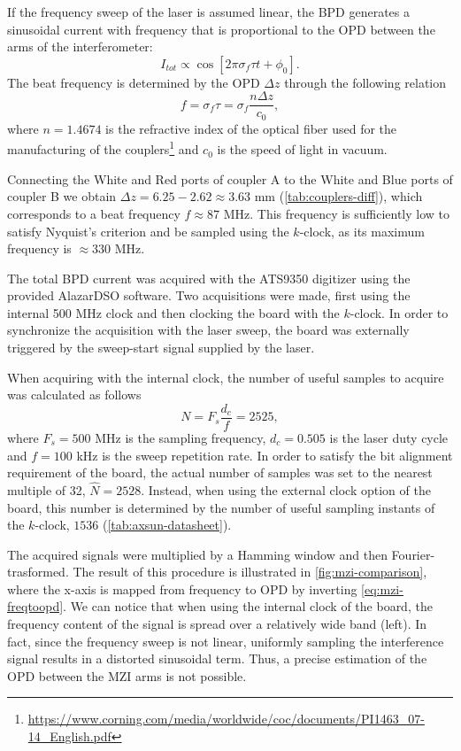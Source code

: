 If the frequency sweep of the laser is assumed linear, the \ac{BPD} generates a sinusoidal current with frequency that is proportional to the \ac{OPD} between the arms of the interferometer:
\begin{equation}
	I_{tot} \propto \cos \left[ 2\pi \sigma_f\tau t +\phi_0 \right].
\end{equation}
The beat frequency is determined by the \ac{OPD} $\Delta z$ through the following relation
\begin{equation}\label{eq:mzi-freqtoopd}
	f = \sigma_f \tau = \sigma_f \frac{n\Delta z}{c_0},
\end{equation}
where $n=1.4674$ is the refractive index of the optical fiber used for the manufacturing of the couplers\footnote{\url{https://www.corning.com/media/worldwide/coc/documents/PI1463_07-14_English.pdf}} and $c_0$ is the speed of light in vacuum. 

Connecting the White and Red ports of coupler A to the White and Blue ports of coupler B we obtain $\Delta z = 6.25-2.62\approx 3.63$ mm (\autoref{tab:couplers-diff}), which corresponds to a beat frequency $f \approx 87$ MHz. This frequency is sufficiently low to satisfy Nyquist's criterion and be sampled using the $k$-clock, as its maximum frequency is $\approx 330$ MHz. 

The total BPD current was acquired with the ATS9350 digitizer using the provided AlazarDSO software. Two acquisitions were made, first using the internal 500 MHz clock and then clocking the board with the $k$-clock. In order to synchronize the acquisition with the laser sweep, the board was externally triggered by the sweep-start signal supplied by the laser. 

When acquiring with the internal clock, the number of useful samples to acquire was calculated as follows
\begin{equation}
	N = F_s \frac{d_c}{f} = 2525,
\end{equation}
where $F_s=500$ MHz is the sampling frequency, $d_c = 0.505$ is the laser duty cycle and $f=100$ kHz is the sweep repetition rate. In order to satisfy the bit alignment requirement of the board, the actual number of samples was set to the nearest multiple of 32, $\hat{N}=2528$. Instead, when using the external clock option of the board, this number is determined by the number of useful sampling instants of the $k$-clock, $1536$ (\autoref{tab:axsun-datasheet}).  

The acquired signals were multiplied by a Hamming window and then Fourier-trasformed. The result of this procedure is illustrated in \autoref{fig:mzi-comparison}, where the x-axis is mapped from frequency to OPD by inverting \autoref{eq:mzi-freqtoopd}. We can notice that when using the internal clock of the board, the frequency content of the signal is spread over a relatively wide band (left). In fact, since the frequency sweep is not linear, uniformly sampling the interference signal results in a distorted sinusoidal term. Thus,  a precise estimation of the OPD between the \ac{MZI} arms is not possible. 


